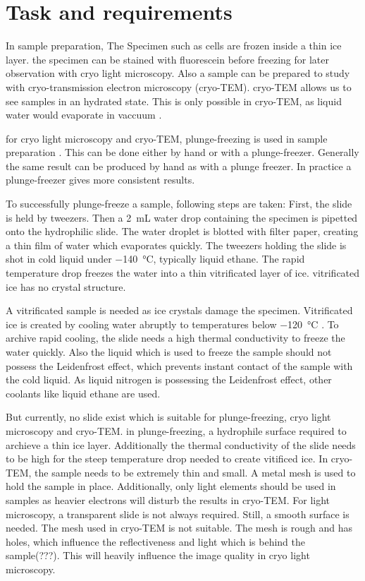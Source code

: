 \section{Task and requirements}

In sample preparation, The Specimen such as cells are frozen inside a thin ice layer. the specimen can be stained with fluorescein before freezing for later observation with cryo light microscopy. Also a sample can be prepared to study with cryo-transmission electron microscopy (cryo-TEM). cryo-TEM allows us to see samples in an hydrated state. This is only possible in cryo-TEM, as liquid water would evaporate in vaccuum \cite{Danino.2012}.

for cryo light microscopy and cryo-TEM, plunge-freezing is used  in sample preparation \cite{Danino.2012} \cite{Faoro.2018}. This can be done either by hand or with a plunge-freezer. Generally the same result can be produced by hand as with a plunge freezer. In practice a plunge-freezer gives more consistent results. 

To successfully plunge-freeze a sample, following steps are taken: First, the slide is held by tweezers. Then a \SI{2}{\milli\liter} water drop containing the specimen is pipetted onto the hydrophilic slide. The water droplet is blotted with filter paper, creating a thin film of water which evaporates quickly. The tweezers holding the slide is shot in cold liquid under \SI{-140}{\degreeCelsius}, typically liquid ethane. The rapid temperature drop freezes the water into a thin vitrificated layer of ice. vitrificated ice has no crystal structure.

A vitrificated sample is needed as ice crystals damage the specimen. Vitrificated ice is created by cooling water abruptly to temperatures below \SI{-120}{\degreeCelsius} \cite{Wowk.2010}. To archive rapid cooling, the slide needs a high thermal conductivity to freeze the water quickly. Also the liquid which is used to freeze the sample should not possess the Leidenfrost effect, which prevents instant contact of the sample with the cold liquid. As liquid nitrogen is possessing the Leidenfrost effect, other coolants like liquid ethane are used.

But currently, no slide exist which is suitable for plunge-freezing, cryo light microscopy and cryo-TEM. in plunge-freezing, a hydrophile surface required to archieve a thin ice layer. Additionally the thermal conductivity of the slide needs to be high for the steep temperature drop needed to create vitificed ice. In cryo-TEM, the sample needs to be extremely thin and small. A metal mesh is used to hold the sample in place. Additionally, only light elements should be used in samples as heavier electrons will disturb the results in cryo-TEM. For light microscopy, a transparent slide is not always required. Still, a smooth surface is needed. The mesh used in cryo-TEM is not suitable. The mesh is rough and has holes, which influence the reflectiveness and light which is behind the sample(???). This will heavily influence the image quality in cryo light microscopy.
 
